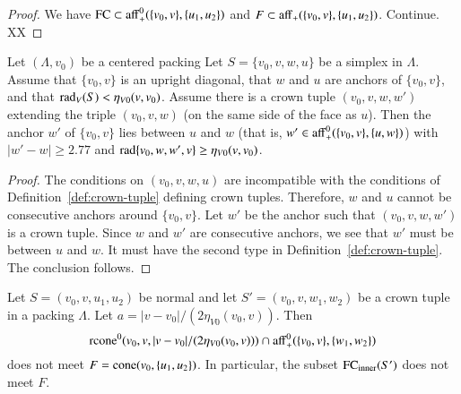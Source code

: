 \begin{proof} We have ${\operatorname{FC}}\subset {\operatorname{aff}}_+^0(\{v_0,v\},\{u_1,u_2\})$
and $F\subset {\operatorname{aff}}_+(\{v_0,v\},\{u_1,u_2\})$.
Continue. XX
\end{proof}

\begin{lemma}
Let $(\Lambda,v_0)$ be a centered packing
  Let $S=\{v_0,v,w,u\}$ be a simplex in $\Lambda$.  Assume that $\{v_0,v\}$ is an
upright diagonal, that $w$ and $u$
are anchors of $\{v_0,v\}$, and that $\operatorname{rad}_V(S)< \eta_{V0}(v,v_0)$.
Assume there is a crown tuple $(v_0,v,w,w')$
extending the triple $(v_0,v,w)$
(on the same side of the face as $u$).  
Then the anchor $w'$ of $\{v_0,v\}$ lies between $u$ and $w$
(that is,  $w'\in{\operatorname{aff}}_+^0(\{v_0,v\},\{u,w\})$) with
    $|w'-w|\ge2.77$ and
    $\operatorname{rad}\{v_0,w,w',v\} \ge \eta_{V0}(v,v_0)$.
\end{lemma}

\begin{proof} The conditions on $(v_0,v,w,u)$ are incompatible with the
conditions of Definition~\ref{def:crown-tuple} defining crown tuples.
Therefore, $w$ and $u$ cannot be consecutive anchors around
$\{v_0,v\}$.  Let $w'$ be the anchor such that $(v_0,v,w,w')$
is a crown tuple.  Since $w$ and $w'$ are consecutive anchors,
we see that $w'$ must be between $u$ and $w$.  It must have the
second type in Definition~\ref{def:crown-tuple}.  The conclusion follows.
\end{proof}



\begin{lemma}  
Let $S=(v_0,v,u_1,u_2)$ be normal and
let $S'=(v_0,v,w_1,w_2)$ be a crown tuple in a packing $\Lambda$.
Let $a = |v-v_0|/(2\eta_{V0}(v_0,v))$.  
Then
$$
 {\operatorname{rcone}}^0(v_0,v,|v-v_0|/(2\eta_{V0}(v_0,v))) \cap
  {\operatorname{aff}}^0_+(\{v_0,v\},\{w_1,w_2\})
$$
does not meet $F={\operatorname{cone}}(v_0,\{u_1,u_2\})$.
In particular, the subset
${\operatorname{FC}}_{\text{inner}}(S')$ does not meet $F$.
\end{lemma}

